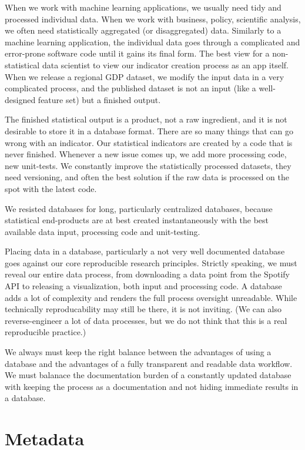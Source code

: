 \documentclass[
  fontsize=13pt,
  english,
  a4paper,
  openany, a4paper, oneside]{book}
\begin{document}
When we work with machine learning applications, we usually need tidy and processed individual data. When we work with business, policy, scientific analysis, we often need statistically aggregated (or disaggregated) data. Similarly to a machine learning application, the individual data goes through a complicated and error-prone software code until it gains its final form. The best view for a non-statistical data scientist to view our indicator creation process as an app itself. When we release a regional GDP dataset, we modify the input data in a very complicated process, and the published dataset is not an input (like a well-designed feature set) but a finished output.

The finished statistical output is a product, not a raw ingredient, and it is not desirable to store it in a database format. There are so many things that can go wrong with an indicator. Our statistical indicators are created by a code that is never finished. Whenever a new issue comes up, we add more processing code, new unit-tests. We constantly improve the statistically processed datasets, they need versioning, and often the best solution if the raw data is processed on the spot with the latest code.

We resisted databases for long, particularly centralized databases, because statistical end-products are at best created instantaneously with the best available data input, processing code and unit-testing.

Placing data in a database, particularly a not very well documented database goes against our core reproducible research principles. Strictly speaking, we must reveal our entire data process, from downloading a data point from the Spotify API to releasing a visualization, both input and processing code. A database adds a lot of complexity and renders the full process oversight unreadable. While technically reproducability may still be there, it is not inviting. (We can also reverse-engineer a lot of data processes, but we do not think that this is a real reproducible practice.)

We always must keep the right balance between the advantages of using a database and the advantages of a fully transparent and readable data workflow. We must balanace the documentation burden of a constantly updated database with keeping the process as a documentation and not hiding immediate results in a database.

\hypertarget{storage-metadata}{%
\section{Metadata}\label{storage-metadata}}
\end{document}
